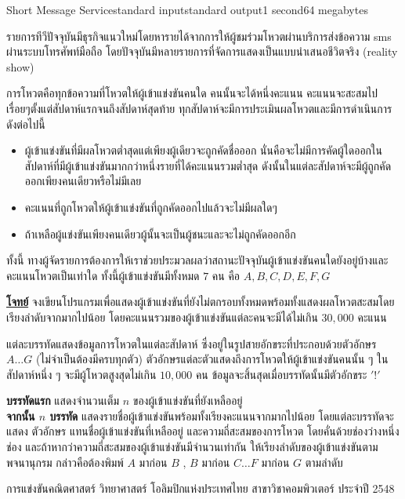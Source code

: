 \documentclass[11pt,a4paper]{article}
\begin{document}
\begin{problem}{Short Message Service}{standard input}{standard output}{1 second}{64 megabytes}

รายการทีวีปัจจุบันมีธุรกิจแนวใหม่โดยหารายได้จากการให้ผู้ชมร่วมโหวตผ่านบริการส่งข้อความ sms ผ่านระบบโทรศัพท์มือถือ โดยปัจจุบันมีหลายรายการที่จัดการแสดงเป็นแบบนำเสนอชีวิตจริง (reality show)

การโหวตคือทุกข้อความที่โหวตให้ผู้เข้าแข่งขันคนใด คนนั้นจะได้หนึ่งคะแนน คะแนนจะสะสมไปเรื่อยๆตั้งแต่สัปดาห์แรกจนถึงสัปดาห์สุดท้าย ทุกสัปดาห์จะมีการประเมินผลโหวตและมีการดำเนินการดังต่อไปนี้

\begin{itemize}
  \item ผู้เข้าแข่งขันที่มีผลโหวตต่ำสุดแต่เพียงผู้เดียวจะถูกคัดชื่อออก นั่นคือจะไม่มีการคัดผู้ใดออกในสัปดาห์ที่มีผู้เข้าแข่งขันมากกว่าหนึ่งรายที่ได้คะแนนรวมต่ำสุด ดังนั้นในแต่ละสัปดาห์จะมีผู้ถูกคัดออกเพียงคนเดียวหรือไม่มีเลย
  \item คะแนนที่ถูกโหวตให้ผู้เข้าแข่งขันที่ถูกคัดออกไปแล้วจะไม่มีผลใดๆ
  \item ถ้าเหลือผู้แข่งขันเพียงคนเดียวผู้นั้นจะเป็นผู้ชนะและจะไม่ถูกคัดออกอีก
\end{itemize}

ทั้งนี้ ทางผู้จัดรายการต้องการให้เราช่วยประมวลผลว่าสถานะปัจจุบันผู้เข้าแข่งขันคนใดยังอยู่บ้างและคะแนนโหวตเป็นเท่าใด ทั้งนี้ผู้เข้าแข่งขันมีทั้งหมด $7$ คน คือ $A, B, C, D, E, F, G$

\underline{\textbf{โจทย์}} จงเขียนโปรแกรมเพื่อแสดงผู้เข้าแข่งขันที่ยังไม่ตกรอบทั้งหมดพร้อมทั้งแสดงผลโหวตสะสมโดยเรียงลำดับจากมากไปน้อย โดยคะแนนรวมของผู้เข้าแข่งขันแต่ละคนจะมีได้ไม่เกิน $30,000$ คะแนน

\InputFile

แต่ละบรรทัดแสดงข้อมูลการโหวตในแต่ละสัปดาห์ ซึ่งอยู่ในรูปสายอักขระที่ประกอบด้วยตัวอักษร $A…G$ (ไม่จำเป็นต้องมีครบทุกตัว) ตัวอักษรแต่ละตัวแสดงถึงการโหวตให้ผู้เข้าแข่งขันคนนั้น ๆ ในสัปดาห์หนึ่ง ๆ จะมีผู้โหวตสูงสุดไม่เกิน $10,000$ คน ข้อมูลจะสิ้นสุดเมื่อบรรทัดนั้นมีตัวอักขระ $'!'$

\OutputFile

\textbf{บรรทัดแรก} แสดงจำนวนเต็ม $n$ ของผู้เข้าแข่งขันที่ยังเหลืออยู่ \\ \textbf{จากนั้น $n$ บรรทัด} แสดงรายชื่อผู้เข้าแข่งขันพร้อมทั้งเรียงคะแนนจากมากไปน้อย โดยแต่ละบรรทัดจะแสดง ตัวอักษร แทนชื่อผู้เข้าแข่งขันที่เหลืออยู่ และความถี่สะสมของการโหวต โดยคั่นด้วยช่องว่างหนึ่งช่อง และถ้าหากว่าความถี่สะสมของผู้เข้าแข่งขันมีจำนวนเท่ากัน ให้เรียงลำดับของผู้เข้าแข่งขันตามพจนานุกรม กล่าวคือต้องพิมพ์ $A$ มาก่อน $B$ , $B$ มาก่อน $C \dotsc F$ มาก่อน $G$ ตามลำดับ

\Examples

\begin{example}
%
\end{example}

\Source

การแข่งขันคณิตศาสตร์ วิทยาศาสตร์ โอลิมปิกแห่งประเทศไทย สาขาวิชาคอมพิวเตอร์ ประจำปี 2548

\end{problem}
\end{document}
